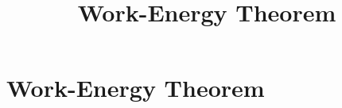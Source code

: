 \documentclass[aspectratio=169,
hyperref={colorlinks,urlcolor=blue}
]{beamer}
\begin{document}










\section{Work-Energy Theorem}
\label{sec:workenergytheorem}
\title{Work-Energy Theorem}
\author{\insertsubsection}


\begin{frame}
\titlepage
\thispagestyle{empty}
\end{frame}















\end{document}
